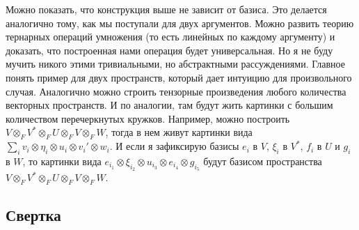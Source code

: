 Можно показать, что конструкция выше не зависит от базиса.
Это делается аналогично тому, как мы поступали для двух аргументов.
Можно развить теорию тернарных операций умножения (то есть линейных по каждому аргументу) и доказать, что построенная нами операция будет универсальная.
Но я не буду мучить никого этими тривиальными, но абстрактными рассуждениями.
Главное понять пример для двух пространств, который дает интуицию для произвольного случая.
Аналогично можно строить тензорные произведения любого количества векторных пространств.
И по аналогии, там будут жить картинки с большим количеством перечеркнутых кружков.
Например, можно построить $V\otimes_F V^* \otimes_F U \otimes_F V \otimes_F W$, тогда в нем живут картинки вида $\sum_i v_i\otimes \eta_i\otimes u_i \otimes v_i'\otimes w_i$.
И если я зафиксирую базисы $e_i$ в $V$, $\xi_i$ в $V^*$, $f_i$ в $U$ и $g_i$ в $W$, то картинки вида $e_{i_1}\otimes \xi_{i_2}\otimes u_{i_3}\otimes e_{i_4}\otimes g_{i_5}$ будут базисом пространства $V\otimes_F V^* \otimes_F U \otimes_F V \otimes_F W$.


\subsection*{Свертка}

